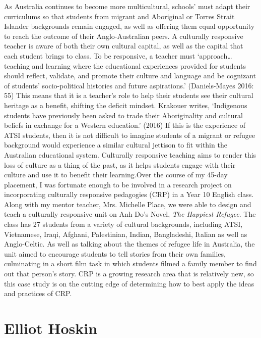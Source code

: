 \documentclass[twoside,12pt,a4paper,notitlepage]{memoir}
\begin{document}
As Australia continues to become more multicultural, schools’ must adapt their curriculums so that students from migrant and Aboriginal or Torres Strait Islander backgrounds remain engaged, as well as offering them equal opportunity to reach the outcome of their Anglo-Australian peers. A culturally responsive teacher is aware of both their own cultural capital, as well as the capital that each student brings to class. To be responsive, a teacher must ‘approach… teaching and learning where the educational experiences provided for students should reflect, validate, and promote their culture and language and be cognizant of students’ socio-political histories and future aspirations.’ (Daniels-Mayes 2016: 55) This means that it is a teacher’s role to help their students see their cultural heritage as a benefit, shifting the deficit mindset. Krakouer writes, ‘Indigenous students have previously been asked to trade their Aboriginality and cultural beliefs in exchange for a Western education.’ (2016) If this is the experience of ATSI students, then it is not difficult to imagine students of a migrant or refugee background would experience a similar cultural jettison to fit within the Australian educational system. Culturally responsive teaching aims to render this loss of culture as a thing of the past, as it helps students engage with their culture and use it to benefit their learning.Over the course of my 45-day placement, I was fortunate enough to be involved in a research project on incorporating culturally responsive pedagogies (CRP) in a Year 10 English class. Along with my mentor teacher, Mrs. Michelle Place, we were able to design and teach a culturally responsive unit on Anh Do’s Novel, \textit{The Happiest Refugee}. The class has 27 students from a variety of cultural backgrounds, including ATSI, Vietnamese, Iraqi, Afghani, Palestinian, Indian, Bangladeshi, Italian as well as Anglo-Celtic. As well as talking about the themes of refugee life in Australia, the unit aimed to encourage students to tell stories from their own families, culminating in a short film task in which students filmed a family member to find out that person’s story. CRP is a growing research area that is relatively new, so this case study is on the cutting edge of determining how to best apply the ideas and practices of CRP.

\section*{Elliot Hoskin}
\end{document}
